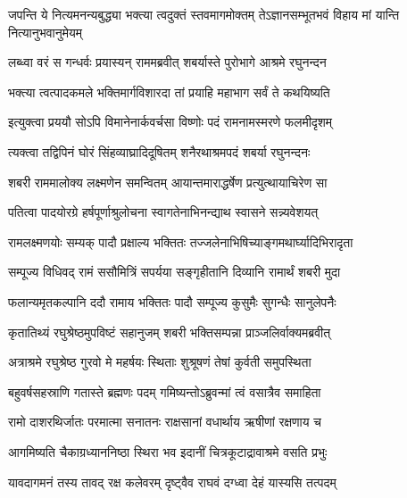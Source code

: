 \fourlineindentedshloka
{जपन्ति ये नित्यमनन्यबुद्ध्या}
{भक्त्या त्वदुक्तं स्तवमागमोक्तम्}
{तेऽज्ञानसम्भूतभवं विहाय}
{मां यान्ति नित्यानुभवानुमेयम्} %






\twolineshloka
{लब्ध्वा वरं स गन्धर्वः प्रयास्यन् राममब्रवीत्}
{शबर्यास्ते पुरोभागे आश्रमे रघुनन्दन} %

\twolineshloka
{भक्त्या त्वत्पादकमले भक्तिमार्गविशारदा}
{तां प्रयाहि महाभाग सर्वं ते कथयिष्यति} %

\twolineshloka
{इत्युक्त्वा प्रययौ सोऽपि विमानेनार्कवर्चसा}
{विष्णोः पदं रामनामस्मरणे फलमीदृशम्} %

\twolineshloka
{त्यक्त्वा तद्विपिनं घोरं सिंहव्याघ्रादिदूषितम्}
{शनैरथाश्रमपदं शबर्या रघुनन्दनः} %

\twolineshloka
{शबरी राममालोक्य लक्ष्मणेन समन्वितम्}
{आयान्तमाराद्धर्षेण प्रत्युत्थायाचिरेण सा} %

\twolineshloka
{पतित्वा पादयोरग्रे हर्षपूर्णाश्रुलोचना}
{स्वागतेनाभिनन्द्याथ स्वासने सन्न्यवेशयत्} %

\twolineshloka
{रामलक्ष्मणयोः सम्यक् पादौ प्रक्षाल्य भक्तितः}
{तज्जलेनाभिषिच्याङ्गमथार्घ्यादिभिरादृता} %

\twolineshloka
{सम्पूज्य विधिवद् रामं ससौमित्रिं सपर्यया}
{सङ्गृहीतानि दिव्यानि रामार्थं शबरी मुदा} %

\twolineshloka
{फलान्यमृतकल्पानि ददौ रामाय भक्तितः}
{पादौ सम्पूज्य कुसुमैः सुगन्धैः सानुलेपनैः} %

\twolineshloka
{कृतातिथ्यं रघुश्रेष्ठमुपविष्टं सहानुजम्}
{शबरी भक्तिसम्पन्ना प्राञ्जलिर्वाक्यमब्रवीत्} %

\twolineshloka
{अत्राश्रमे रघुश्रेष्ठ गुरवो मे महर्षयः}
{स्थिताः शुश्रूषणं तेषां कुर्वती समुपस्थिता} %

\twolineshloka
{बहुवर्षसहस्राणि गतास्ते ब्रह्मणः पदम्}
{गमिष्यन्तोऽब्रुवन्मां त्वं वसात्रैव समाहिता} %

\twolineshloka
{रामो दाशरथिर्जातः परमात्मा सनातनः}
{राक्षसानां वधार्थाय ऋषीणां रक्षणाय च} %

\twolineshloka
{आगमिष्यति चैकाग्रध्याननिष्ठा स्थिरा भव}
{इदानीं चित्रकूटाद्रावाश्रमे वसति प्रभुः} %

\twolineshloka
{यावदागमनं तस्य तावद् रक्ष कलेवरम्}
{दृष्ट्वैव राघवं दग्ध्वा देहं यास्यसि तत्पदम्} %

